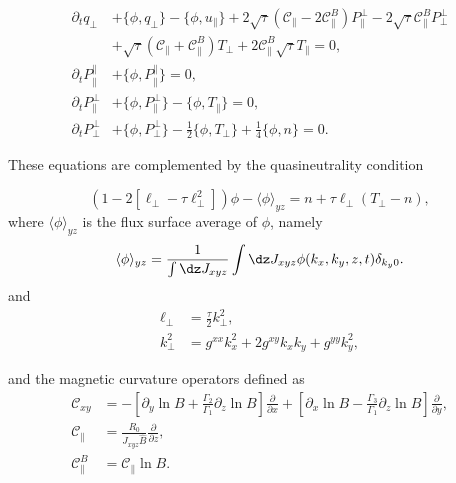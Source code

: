 \begin{align}
\partial_t q_\perp &+ \{\phi, q_\perp\} - \{\phi, u_\parallel\} + 2\sqrt{\tau}(\mathcal{C}_\parallel - 2\mathcal{C}_\parallel^B)P_\parallel^\perp - 2\sqrt{\tau} \mathcal{C}_\parallel^B P_\perp^\perp \nonumber\\
&+ \sqrt{\tau}(\mathcal{C}_\parallel + \mathcal{C}_\parallel^B)T_\perp + 2 \mathcal{C}_\parallel^B\sqrt{\tau} T_\parallel = 0,\\
\partial_t P_\parallel^\parallel &+ \{\phi, P_\parallel^\parallel\} = 0, \\
\partial_t P_\parallel^\perp &+ \{\phi, P_\parallel^\perp\} - \{\phi, T_\parallel\} = 0, \\
\partial_t P_\perp^\perp &+ \{\phi, P_\perp^\perp\} - \frac{1}{2}\{\phi, T_\perp\} + \frac{1}{4}\{\phi, n\} = 0.
\end{align}

These equations are complemented by the quasineutrality condition

\begin{equation}
\left(1 - 2\left[\ell_\perp - \tau\ell_\perp^2\right]\right)\phi - \langle\phi\rangle_{yz} = n + \tau\ell_\perp(T_\perp - n),
\end{equation}
where $\langle \phi \rangle_{yz}$ is the flux surface average of $\phi$, namely
\begin{equation}
    \langle \phi \rangle_{yz} = \frac{1}{\int\dz J_{xyz}}\int\dz J_{xyz}\phi(k_x,k_y,z,t)\delta_{k_y0}.
\end{equation}
and
\begin{align}
\ell_\perp &= \frac{\tau}{2} k_\perp^2,\\
k_\perp^2 &= g^{xx}k_x^2 + 2g^{xy}k_x k_y + g^{yy}k_y^2,
\end{align}

and the magnetic curvature operators defined as
\begin{align}
\mathcal{C}_{xy} &= -\left[\partial_y \ln B + \frac{\Gamma_2}{\Gamma_1}\partial_z \ln B\right]\frac{\partial}{\partial x} + \left[\partial_x \ln B - \frac{\Gamma_3}{\Gamma_1}\partial_z \ln B\right]\frac{\partial}{\partial y},\\
\mathcal{C}_\parallel &= \frac{R_0}{J_{xyz}\hat{B}}\frac{\partial}{\partial z},\\
\mathcal{C}_\parallel^{B} &= \mathcal{C}_\parallel\ln B.
\end{align}

